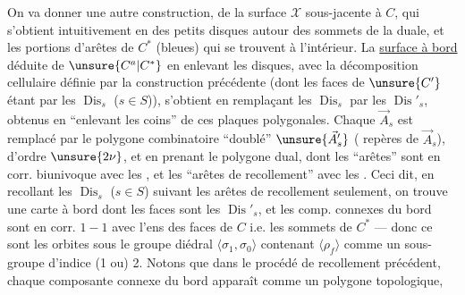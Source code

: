 On va donner une autre construction, de la surface $\mathcal X$ sous-jacente à $C$, qui s'obtient intuitivement en  des petits disques  autour des sommets de la   duale,  et  les portions d'arêtes de $C^*$ (bleues) qui se trouvent à l'intérieur. La \uline{surface à bord} déduite de $\unsure{C^a|C^*}$ en enlevant les disques, avec la décomposition cellulaire définie par la construction précédente (dont les faces de $\unsure{C'}$ étant  par les $\operatorname{Dis}_s$ ($s\in S$)), s'obtient en remplaçant les $\operatorname{Dis}_s$ par les $\operatorname{Dis}'_s$, obtenus en ``enlevant les coins'' de ces plaques polygonales. Chaque $\vec A_s$ est remplacé par le polygone combinatoire ``doublé'' $\unsure{\vec A'_s}$ (  repères de $\vec A_s$),  d'ordre $\unsure{2\nu}$, et en prenant le polygone dual, dont les ``arêtes''  sont en corr. biunivoque avec les   , et les ``arêtes de recollement'' avec les   . Ceci dit, en recollant les $\operatorname{Dis}_s$ ($s\in S$) suivant les arêtes de recollement seulement, on trouve une carte à bord dont les faces sont les $\operatorname{Dis}'_s$, et les comp. connexes du bord sont en corr. $1-1$ avec l'ens des faces de $C$ i.e. les sommets de $C^*$ --- donc ce sont les orbites sous le groupe diédral $\langle\sigma_1,\sigma_0\rangle$ contenant $\langle\rho_f\rangle$ comme un sous-groupe d'indice (1 ou) 2. Notons que dans le procédé de recollement précédent, chaque composante connexe  du bord apparaît comme un polygone topologique, 


